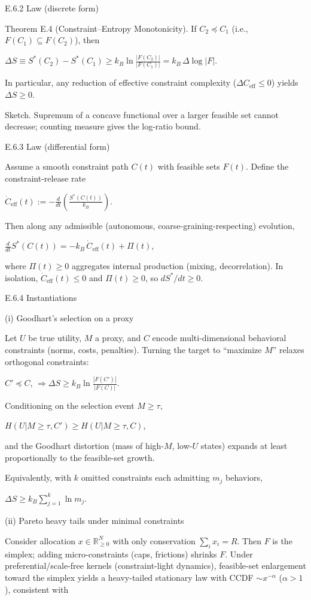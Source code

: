 \documentclass[11pt,a4paper]{article}
\begin{document}
E.6.2 Law (discrete form)

Theorem E.4 (Constraint–Entropy Monotonicity).
If $C_2 \preceq C_1$ (i.e., $F(C_1) \subseteq F(C_2)$), then

$\Delta S \equiv S^*(C_2) - S^*(C_1) \geq k_B \ln \frac{|F(C_2)|}{|F(C_1)|} = k_B \, \Delta \log |F|$.

In particular, any reduction of effective constraint complexity ($\Delta C_\mathrm{eff} \leq 0$) yields $\Delta S \geq 0$.

Sketch. Supremum of a concave functional over a larger feasible set cannot decrease; counting measure gives the log-ratio bound.

E.6.3 Law (differential form)

Assume a smooth constraint path $C(t)$ with feasible sets $F(t)$. Define the constraint-release rate

$\dot C_\mathrm{eff}(t) := - \frac{d}{dt} \left( \frac{S^*(C(t))}{k_B} \right)$.

Then along any admissible (autonomous, coarse-graining-respecting) evolution,

$\frac{d}{dt} S^*(C(t)) = -k_B \, \dot C_\mathrm{eff}(t) + \Pi(t)$,

where $\Pi(t) \geq 0$ aggregates internal production (mixing, decorrelation). In isolation, $\dot C_\mathrm{eff}(t) \leq 0$ and $\Pi(t) \geq 0$, so $d S^* / dt \geq 0$.

E.6.4 Instantiations

(i) Goodhart’s selection on a proxy

Let $U$ be true utility, $M$ a proxy, and $C$ encode multi-dimensional behavioral constraints (norms, costs, penalties). Turning the target to “maximize $M$” relaxes orthogonal constraints:

$C' \preceq C$, $\Rightarrow \Delta S \geq k_B \ln \frac{|F(C')|}{|F(C)|}$.

Conditioning on the selection event $M \geq \tau$,

$H(U | M \geq \tau, C') \geq H(U | M \geq \tau, C)$,

and the Goodhart distortion (mass of high-$M$, low-$U$ states) expands at least proportionally to the feasible-set growth.

Equivalently, with $k$ omitted constraints each admitting $m_j$ behaviors,

$\Delta S \geq k_B \sum_{j=1}^k \ln m_j$.

(ii) Pareto heavy tails under minimal constraints

Consider allocation $x \in \mathbb{R}_{\geq 0}^N$ with only conservation $\sum_i x_i = R$. Then $F$ is the simplex; adding micro-constraints (caps, frictions) shrinks $F$. Under preferential/scale-free kernels (constraint-light dynamics), feasible-set enlargement toward the simplex yields a heavy-tailed stationary law with CCDF $\sim x^{-\alpha}$ ($\alpha > 1$), consistent with
\end{document}
